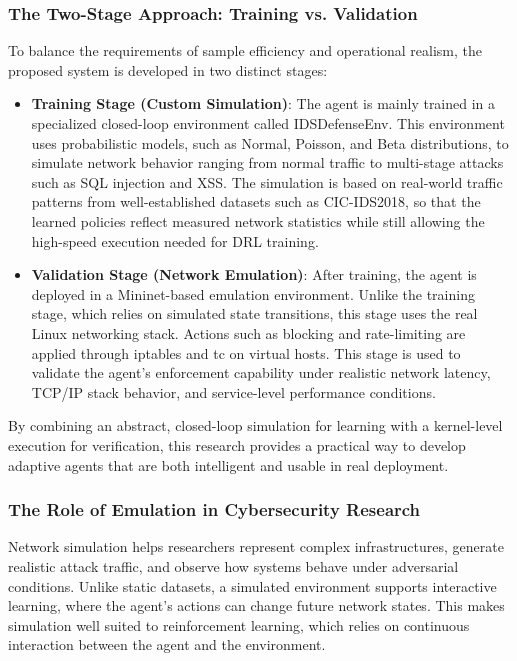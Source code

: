 \documentclass[12pt,a4paper]{report}
\begin{document}
\subsubsection*{The Two-Stage Approach: Training vs. Validation}

To balance the requirements of sample efficiency and operational realism, the proposed system is developed in two distinct stages:

\begin{itemize}
    \item \textbf{Training Stage (Custom Simulation)}: The agent is mainly trained in a specialized closed-loop environment called IDSDefenseEnv. This environment uses probabilistic models, such as Normal, Poisson, and Beta distributions, to simulate network behavior ranging from normal traffic to multi-stage attacks such as SQL injection and XSS. The simulation is based on real-world traffic patterns from well-established datasets such as CIC-IDS2018, so that the learned policies reflect measured network statistics while still allowing the high-speed execution needed for DRL training.
    \item \textbf{Validation Stage (Network Emulation)}: After training, the agent is deployed in a Mininet-based emulation environment. Unlike the training stage, which relies on simulated state transitions, this stage uses the real Linux networking stack. Actions such as blocking and rate-limiting are applied through iptables and tc on virtual hosts. This stage is used to validate the agent’s enforcement capability under realistic network latency, TCP/IP stack behavior, and service-level performance conditions.
\end{itemize}

By combining an abstract, closed-loop simulation for learning with a kernel-level execution for verification, this research provides a practical way to develop adaptive agents that are both intelligent and usable in real deployment.

\subsubsection*{The Role of Emulation in Cybersecurity Research}

Network simulation helps researchers represent complex infrastructures, generate realistic attack traffic, and observe how systems behave under adversarial conditions. Unlike static datasets, a simulated environment supports interactive learning, where the agent’s actions can change future network states. This makes simulation well suited to reinforcement learning, which relies on continuous interaction between the agent and the environment.
\end{document}
